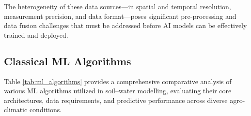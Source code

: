 \documentclass[land,article,submit,pdftex,moreauthors]{Definitions/mdpi}
\numberwithin{equation}{section}
\begin{document}
The heterogeneity of these data sources---in spatial and temporal resolution, measurement precision, and data format---poses significant pre-processing and data fusion challenges that must be addressed before AI models can be effectively trained and deployed.

\subsection{Classical ML Algorithms}

Table \ref{tab:ml_algorithms} provides a comprehensive comparative analysis of various ML algorithms utilized in soil--water modelling, evaluating their core architectures, data requirements, and predictive performance across diverse agro-climatic conditions.

\footnotesize
\setlength{\tabcolsep}{3pt}
\renewcommand{\arraystretch}{1.3}
\end{document}
